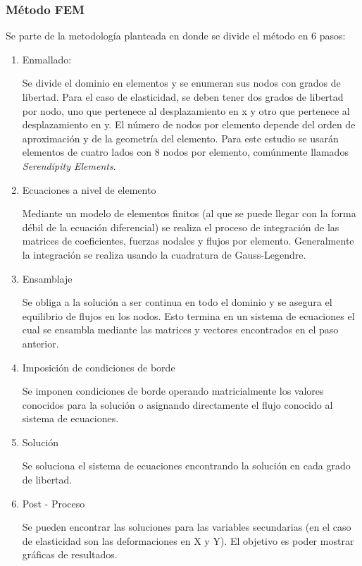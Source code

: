 		\subsubsection{Método FEM}
		Se parte de la metodología planteada en \parencite{Reddy} donde se divide el método en 6 pasos:
			\begin{enumerate}
				\item Enmallado:

				Se divide el dominio en elementos y se enumeran sus nodos con grados de libertad. Para el caso de elasticidad, se deben tener dos grados de libertad por nodo, uno que pertenece al desplazamiento en x y otro que pertenece al desplazamiento en y. El número de nodos por elemento depende del orden de aproximación y de la geometría del elemento. Para este estudio se usarán elementos de cuatro lados con 8 nodos por elemento, comúnmente llamados \textit{Serendipity Elements}.
				\item Ecuaciones a nivel de elemento

				Mediante un modelo de elementos finitos (al que se puede llegar con la forma débil de la ecuación diferencial) se realiza el proceso de integración de las matrices de coeficientes, fuerzas nodales y flujos por elemento. Generalmente la integración se realiza usando la cuadratura de Gauss-Legendre.
				\item Ensamblaje

				Se obliga a la solución a ser continua en todo el dominio y se asegura el equilibrio de flujos en los nodos. Esto termina en un sistema de ecuaciones el cual se ensambla mediante las matrices y vectores encontrados en el paso anterior. 
				\item Imposición de condiciones de borde

				Se imponen condiciones de borde operando matricialmente los valores conocidos para la solución o asignando directamente el flujo conocido al sistema de ecuaciones. 
				\item Solución

				Se soluciona el sistema de ecuaciones encontrando la solución en cada grado de libertad.
				\item Post - Proceso

				Se pueden encontrar las soluciones para las variables secundarias (en el caso de elasticidad son las deformaciones en X y Y). El objetivo es poder mostrar gráficas de resultados.
			\end{enumerate}
